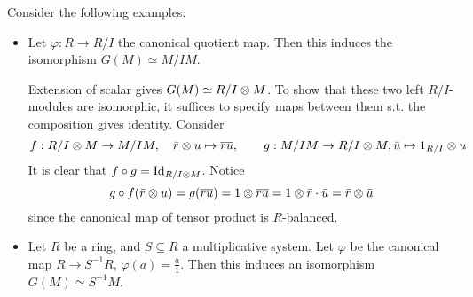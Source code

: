 \begin{example}
    Consider the following examples:
    \begin{itemize}
        \item Let $\varphi: R \to R/I$ the canonical quotient map. Then this induces the isomorphism $G(M) \simeq M/IM$.
        
        Extension of scalar gives $G(M) \simeq R/I \otimes M$. To show that these two left $R/I$-modules are isomorphic, it suffices to specify maps between them s.t. the composition gives identity. Consider
        \[
            f: R/I \otimes M \to M/IM, \quad \bar{r} \otimes u \mapsto \overline{ru}, \qquad g: M/IM \to R/I \otimes M, \bar{u} \mapsto 1_{R/I} \otimes u
        \]
        It is clear that $f \circ g = \mathrm{Id}_{R/I \otimes M}$. Notice
        \[
            g \circ f (\bar{r} \otimes u) = g(\overline{ru}) = 1 \otimes \overline{ru} = 1 \otimes \bar{r} \cdot \bar{u} = \bar{r} \otimes \bar{u}
        \]
        since the canonical map of tensor product is $R$-balanced.
        \item Let $R$ be a ring, and $S \subseteq R$ a multiplicative system. Let $\varphi$ be the canonical map $R \to S^{-1}R$, $\varphi(a) = \frac{a}{1}$. Then this induces an isomorphism $G(M) \simeq S^{-1}M$.
        

\end{itemize}
\end{example}
